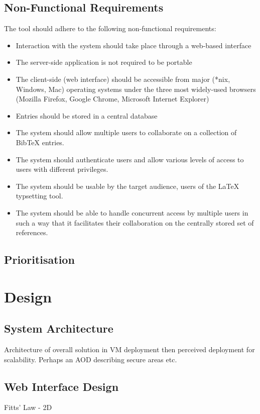 \documentclass{l4proj}
\begin{document}
\section{Non-Functional Requirements}
The tool should adhere to the following non-functional requirements:
\begin{itemize}
\item Interaction with the system should take place through a web-based interface
\item The server-side application is not required to be portable
\item The client-side (web interface) should be accessible from major (*nix, Windows, Mac) operating systems under the three most widely-used browsers (Mozilla Firefox, Google Chrome, Microsoft Internet Explorer)
\item Entries should be stored in a central database
\item The system should allow multiple users to collaborate on a collection of BibTeX entries.
\item The system should authenticate users and allow various levels of access to users with different privileges.
\item The system should be usable by the target audience, users of the LaTeX typsetting tool.
\item The system should be able to handle concurrent access by multiple users in such a way that it facilitates their collaboration on the centrally stored set of references.
\end{itemize}

\section{Prioritisation}



\chapter{Design}
\label{design}

\section{System Architecture}
Architecture of overall solution in VM deployment then perceived deployment for scalability. Perhaps an AOD describing secure areas etc.

\section{Web Interface Design}
Fitts' Law - 2D
\end{document}
